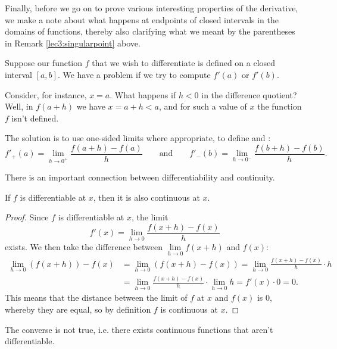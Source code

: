 Finally, before we go on to prove various interesting properties of the derivative, we make a note about what happens at endpoints of closed intervals in the domains of functions, thereby also clarifying what we meant by the parentheses in Remark \ref{lec3:singularpoint} above.

\begin{remark}
	Suppose our function $f$ that we wish to differentiate is defined on a closed interval $[a, b]$.
	We have a problem if we try to compute $f'(a)$ or $f'(b)$.

	Consider, for instance, $x = a$.
	What happens if $h < 0$ in the difference quotient?
	Well, in $f(a + h)$ we have $x = a + h < a$, and for such a value of $x$ the function $f$ isn't defined.

	The solution is to use one-sided limits where appropriate, to define  and :
	\[
		f'_+(a) = \lim_{h \to 0^+} \frac{f(a + h) - f(a)}{h} \qquad \text{and} \qquad f'_- (b) = \lim_{h \to 0^-} \frac{f(b + h) - f(b)}{h}.
	\]
\end{remark}

\noindent
There is an important connection between differentiability and continuity.

\begin{theorem}\label{lec3:diffimpliescont}
	If $f$ is differentiable at $x$, then it is also continuous at $x$.
\end{theorem}

\begin{proof}
	Since $f$ is differentiable at $x$, the limit
	\[
		f'(x) = \lim_{h \to 0} \frac{f(x + h) - f(x)}{h}
	\]
	exists. We then take the difference between $\lim\limits_{h \to 0} f(x + h)$ and $f(x)$:
	\begin{align*}
		\lim\limits_{h \to 0} (f(x + h)) - f(x) & = \lim_{h \to 0} (f(x + h) - f(x)) = \lim_{h \to 0} \frac{f(x + h) - f(x)}{h} \cdot h  \\
		                                        & = \lim_{h \to 0} \frac{f(x + h) - f(x)}{h} \cdot \lim_{h \to 0} h = f'(x) \cdot 0 = 0.
	\end{align*}
	This means that the distance between the limit of $f$ at $x$ and $f(x)$ is 0, whereby they are equal, so by definition $f$ is continuous at $x$.
\end{proof}

\noindent
The converse is not true, i.e. there exists continuous functions that aren't differentiable.

